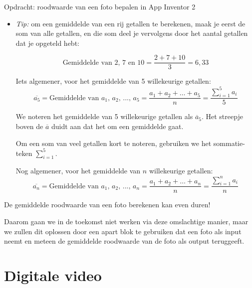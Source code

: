 \begin{opdracht}{Opdracht: roodwaarde van een foto bepalen in App Inventor 2}
\begin{enumerate}
\begin{itemize}
		\item \emph{Tip:} om een gemiddelde van een rij getallen te berekenen, maak je eerst de som van alle getallen, en die som deel je vervolgens door het aantal getallen dat je opgeteld hebt:
		
		\begin{equation*}
		\text{Gemiddelde van 2, 7 en 10} = \frac{2+7+10}{3} = 6,33
		\end{equation*}
		
		Iets algemener, voor het gemiddelde van 5 willekeurige getallen:
		\begin{equation*}
		\overline{a_5} = \text{Gemiddelde van $a_1$, $a_2$, ..., $a_5$} = \frac{a_1+a_2+\ldots+a_5}{n} = \frac{\sum_{i=1}^{5} a_i}{5}
		\end{equation*}
		
		We  noteren het gemiddelde van 5 willekeurige getallen als $\overline{a}_5$. Het streepje boven de $\overline{a}$ duidt aan dat het om een gemiddelde gaat.
		
		Om een som van veel getallen kort te noteren, gebruiken we het sommatie-teken $\sum_{i=1}^{5}$.
		
		Nog algemener, voor het gemiddelde van $n$ willekeurige getallen:
		\begin{equation*}
		\overline{a_n} = \text{Gemiddelde van $a_1$, $a_2$, ..., $a_n$} = \frac{a_1+a_2+\ldots+a_n}{n} = \frac{\sum_{i=1}^{n} a_i}{n}
		\end{equation*}
		
	\end{itemize}

	\begin{opmerking}
		De gemiddelde roodwaarde van een foto berekenen kan even duren!
		
		Daarom gaan we in de toekomst niet werken via deze omslachtige manier, maar we zullen dit oplossen door een apart blok te gebruiken dat een foto als input neemt en meteen de gemiddelde roodwaarde van de foto als output teruggeeft.
	\end{opmerking}
\end{enumerate}
\end{opdracht}

\section{Digitale video}
\label{sec:Mod3_Sec2}
%

